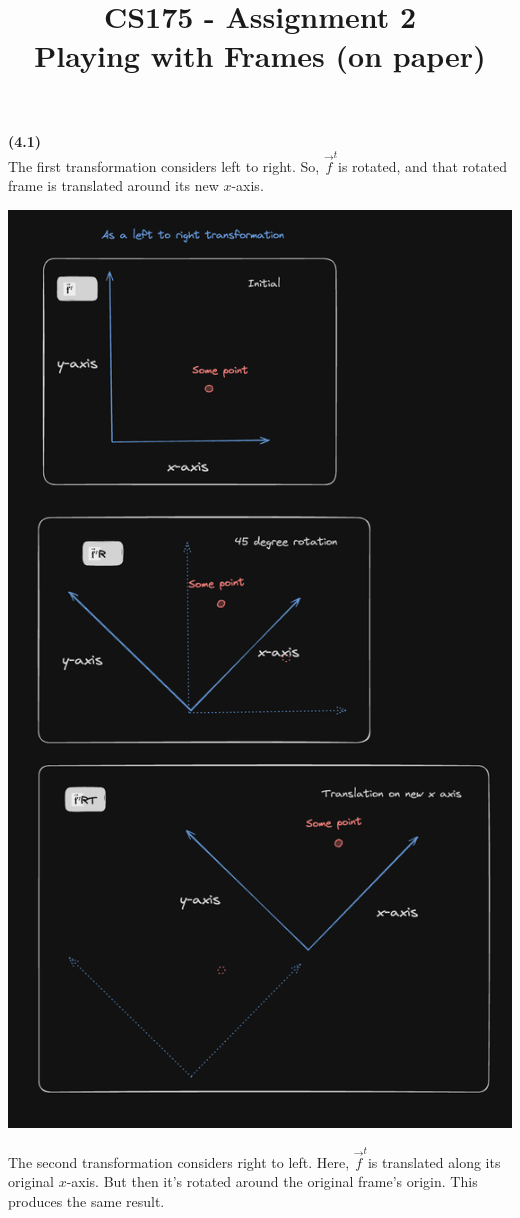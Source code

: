 \documentclass[letterpaper, 11pt]{article}
\title{CS175 - Assignment 2 \\Playing with Frames (on paper)}
\newcommand{\ft}{$\vec{f}^t$}
\begin{document}
\noindent \textbf{(4.1)} \\ 
The first transformation considers left to right. So, \ft is rotated, and that rotated frame is translated around its new $x$-axis. 

\medskip
\includegraphics[scale=0.6]{./pics/q1_ltr.png}

\newpage
\medskip
\noindent The second transformation considers right to left. Here, \ft is translated along its original $x$-axis. But then it's rotated around the original frame's origin. This produces the same result. 
\end{document}
